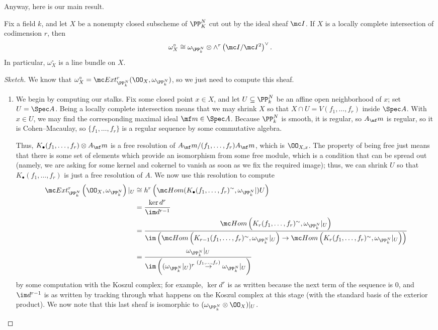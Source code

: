 \documentclass[../notes.tex]{subfiles}
\begin{document}
Anyway, here is our main result.
\begin{theorem}
	Fix a field $k$, and let $X$ be a nonempty closed subscheme of $\PP^N_K$ cut out by the ideal sheaf $\mc I$. If $X$ is a locally complete intersection of codimension $r$, then
	\[\omega_X^\circ\cong\omega_{\PP^N_k}\otimes\land^r\left(\mc I/\mc I^2\right)^\lor.\]
	In particular, $\omega_X^\circ$ is a line bundle on $X$.
\end{theorem}
\begin{proof}[Sketch]
	We know that $\omega_X^\circ=\mc Ext_{\PP^N_k}^r(\OO_X,\omega_{\PP^N_k})$, so we just need to compute this sheaf.
	\begin{enumerate}
		\item We begin by computing our stalks. Fix some closed point $x\in X$, and let $U\subseteq\PP^N_k$ be an affine open neighborhood of $x$; set $U=\Spec A$. Being a locally complete intersection means that we may shrink $X$ so that $X\cap U=V(f_1,\ldots,f_r)$ inside $\Spec A$. With $x\in U$, we may find the corresponding maximal ideal $\mf m\in\Spec A$. Because $\PP^N_k$ is smooth, it is regular, so $A_\mf m$ is regular, so it is Cohen--Macaulay, so $\{f_1,\ldots,f_r\}$ is a regular sequence by some commutative algebra.

		Thus, $K_\bullet(f_1,\ldots,f_r)\otimes A_\mf m$ is a free resolution of $A_\mf m/(f_1,\ldots,f_r)A_\mf m$, which is $\OO_{X,x}$. The property of being free just means that there is some set of elements which provide an isomorphism from some free module, which is a condition that can be spread out (namely, we are asking for some kernel and cokernel to vanish as soon as we fix the required image); thus, we can shrink $U$ so that $K_\bullet(f_1,\ldots,f_r)$ is just a free resolution of $A$. We now use this resolution to compute
		\begin{align*}
			\mc Ext^r_{\PP^N_k}\left(\OO_X,\omega_{\PP^N_k}\right)|_U &\cong h^r\left(\mc Hom(K_\bullet(f_1,\ldots,f_r)^{\sim},\omega_{\PP^N_k}|)U\right) \\
			&= \frac{\ker d^r}{\im d^{r-1}} \\
			&= \frac{\mc Hom\left(K_r(f_1,\ldots,f_r)^{\sim},\omega_{\PP^N_k}|_U\right)}{\im\left(\mc Hom\left(K_{r-1}(f_1,\ldots,f_r)^{\sim},\omega_{\PP^N_k}|_U\right)\to\mc Hom\left(K_r(f_1,\ldots,f_r)^{\sim},\omega_{\PP^N_k}|_U\right)\right)} \\
			&= \frac{\omega_{\PP^N_k}|_U}{\im\left((\omega_{\PP^N_k}|_U)^r\stackrel{(f_1,\ldots,f_r)}\to\omega_{\PP^N_k}|_U\right)}
		\end{align*}
		by some computation with the Koszul complex; for example, $\ker d^r$ is as written because the next term of the sequence is $0$, and $\im d^{r-1}$ is as written by tracking through what happens on the Koszul complex at this stage (with the standard basis of the exterior product). We now note that this last sheaf is isomorphic to $(\omega_{\PP^N_k}\otimes\OO_X)|_U$.


\end{enumerate}
\end{proof}
\end{document}
